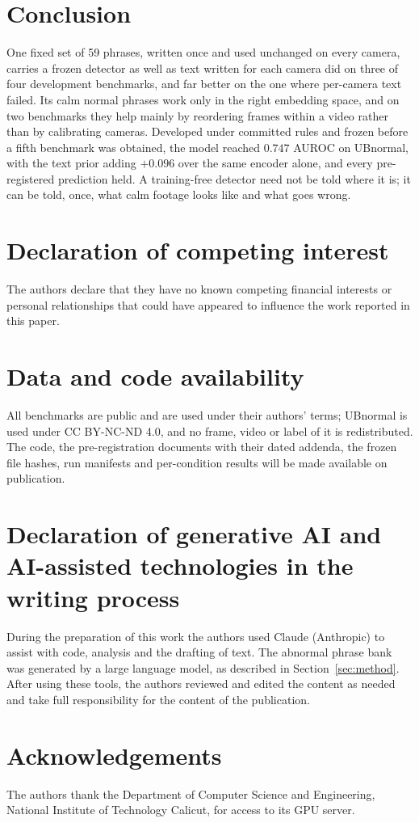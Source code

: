 \documentclass[a4paper,fleqn]{cas-sc}
\begin{document}
\section{Conclusion}
\label{sec:conclusion}

One fixed set of 59 phrases, written once and used unchanged on every camera, carries a
frozen detector as well as text written for each camera did on three of four
development benchmarks, and far better on the one where per-camera text failed. Its
calm normal phrases work only in the right embedding space, and on two benchmarks they
help mainly by reordering frames within a video rather than by calibrating cameras. Developed under committed
rules and frozen before a fifth benchmark was obtained, the model reached $0.747$ AUROC
on UBnormal, with the text prior adding $+0.096$ over the same encoder alone, and every
pre-registered prediction held. A training-free detector need not be told where it is;
it can be told, once, what calm footage looks like and what goes wrong.

\section*{Declaration of competing interest}
The authors declare that they have no known competing financial interests or personal
relationships that could have appeared to influence the work reported in this paper.

\section*{Data and code availability}
All benchmarks are public and are used under their authors' terms; UBnormal is used
under CC BY-NC-ND 4.0, and no frame, video or label of it is redistributed. The code,
the pre-registration documents with their dated addenda, the frozen file hashes, run
manifests and per-condition results will be made available on publication.

\section*{Declaration of generative AI and AI-assisted technologies in the writing process}
During the preparation of this work the authors used Claude (Anthropic) to assist with
code, analysis and the drafting of text. The abnormal phrase bank was generated by a
large language model, as described in Section~\ref{sec:method}. After using these
tools, the authors reviewed and edited the content as needed and take full
responsibility for the content of the publication.

\section*{Acknowledgements}
The authors thank the Department of Computer Science and Engineering, National
Institute of Technology Calicut, for access to its GPU server.

\printcredits



\end{document}
